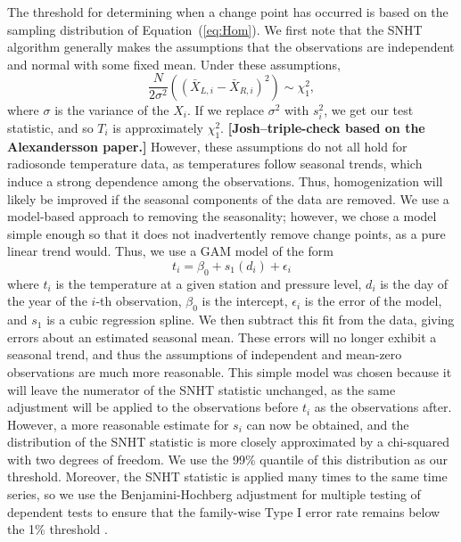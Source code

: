 \documentclass[12pt]{article}
\def\ni{\noindent}
\begin{document}
\begin{doublespacing}
The threshold for determining when a change point has occurred is based on the sampling distribution of Equation~(\ref{eq:Hom}).  We first note that the SNHT algorithm generally makes the assumptions that the observations are independent and normal with some fixed mean.  Under these assumptions, 
\begin{equation*}
	\frac{N}{2 \sigma^2}\left( (\bar{X}_{L,i}-\bar{X}_{R,i})^2\right) \sim \chi^2_1,
\end{equation*}
\ni where $\sigma$ is the variance of the $X_i$.  If we replace $\sigma^2$ with $s_i^2$, we get our test statistic, and so $T_i$ is approximately $\chi^2_1$. \textbf{[Josh--triple-check based on the Alexandersson paper.]}  However, these assumptions do not all hold for radiosonde temperature data, as temperatures follow seasonal trends, which induce a strong dependence among the observations.  Thus, homogenization will likely be improved if the seasonal components of the data are removed.  We use a model-based approach to removing the seasonality; however, we  chose a model simple enough so that it does not inadvertently remove change points, as a pure linear trend would.  Thus, we use a GAM model of the form
\begin{equation}\label{eq:season}
	t_i = \beta_0 + s_1(d_i) + \epsilon_i
\end{equation}
where $t_i$ is the temperature at a given station and pressure level, $d_i$ is the day of the year of the $i$-th observation, $\beta_0$ is the intercept, $\epsilon_i$ is the error of the model, and $s_1$ is a cubic regression spline.   We then subtract this fit from the data, giving errors about an estimated seasonal mean.  These errors will no longer exhibit a seasonal trend, and thus the assumptions of independent and mean-zero observations are much more reasonable.  This simple model was chosen because it will leave the numerator of the SNHT statistic unchanged, as the same adjustment will be applied to the observations before $t_i$ as the observations after.  However, a more reasonable estimate for $s_i$ can now be obtained, and the distribution of the  SNHT statistic is more closely approximated by a chi-squared with {two} degrees of freedom.  We use the 99\% quantile of this distribution as our threshold.  Moreover, the SNHT statistic is applied many times to the same time series, so we use the Benjamini-Hochberg adjustment for multiple testing of dependent tests to ensure that the family-wise Type I error rate remains below the 1\% threshold \cite{benjamini01}.


\end{doublespacing}
\end{document}
